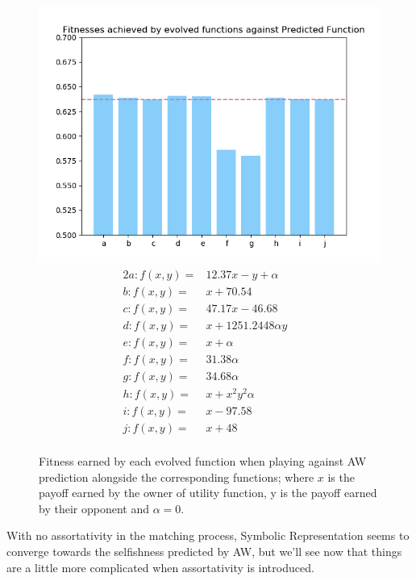 \documentclass[11pt]{book}
\newcommand*{\np}{\par\noindent\newline}
\begin{document}
\begin{figure}
	\centering
	\includegraphics[scale=0.7]{resources/ylim_barchart_fitness_earned_against_target_r_00.png}
	\begin{alignat*}{2}
		a: f(x, y) = & 12.37x - y + \alpha &\\
		b: f(x, y) = & x + 70.54&\\
		c: f(x, y) = & 47.17x - 46.68&\\
		d: f(x, y) = & x + 1251.2448\alpha y&\\
		e: f(x, y) = & x + \alpha &\\
		f: f(x, y) = & 31.38\alpha &\\
		g: f(x, y) = & 34.68\alpha &\\
		h: f(x, y) = & x + x^2y^2\alpha &\\
		i: f(x, y) = & x - 97.58&\\
		j: f(x, y) = & x + 48&\\
	\end{alignat*}
	\caption{Fitness earned by each evolved function when playing against AW prediction alongside the corresponding functions; where $x$ is the payoff earned by the owner of utility function, y is the payoff earned by their opponent and $\alpha = 0$.}
	\label{barchart_fitness_earned_against_target_r_00}
\end{figure}

\np With no assortativity in the matching process, Symbolic Representation seems to converge towards the selfishness predicted by AW,
but we'll see now that things are a little more complicated when assortativity is introduced.
\end{document}
